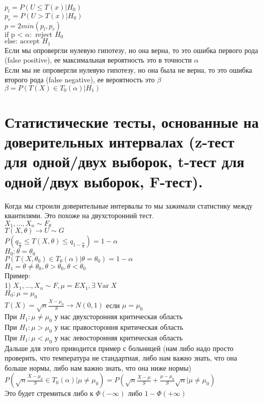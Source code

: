 \documentclass{article}
\newcommand\0{\mathbb{0}}
\DeclareMathOperator{\Var}{Var}
\newcommand\1{\mathbb{1}}
\begin{document}
$p_l = P(U \leq T(x) | H_0)$\\
$p_r = P(U > T(x) | H_0)$\\
$p = 2min(p_l, p_r)$\\
$\text{if p < } \alpha: \text{ reject }H_0$\\
$\text{else: accept }H_1$\\
Если мы опровергли нулевую гипотезу, но она верна, то это ошибка первого рода (false positive), ее максимальная вероятность это в точности $\alpha$\\
Если мы не опровергли нулевую гипотезу, но она была не верна, то это ошибка второго рода (false negative), ее вероятность это $\beta$\\
$\beta = P(T(X) \in T_0(\alpha) | H_1)$\\
\section{Статистические тесты, основанные на доверительных интервалах (z-тест для одной/двух
выборок, t-тест для одной/двух выборок, F-тест).}
Когда мы строили доверительные интервалы то мы зажимали статистику между квантилями. Это похоже на двухсторонний тест.\\
$X_1, \dots, X_n \sim F_{\theta}$\\
$T(X, \theta) \to U \sim G$\\
$P(q_{\frac{\alpha}{2}} \leq T(X, \theta) \leq q_{1 - \frac{\alpha}{2}}) = 1 - \alpha$\\
$H_0 : \theta = \theta_0$\\
$P(T(X, \theta_0) \in T_0(\alpha) | \theta = \theta_0) = 1 - \alpha$\\
$H_1 = \theta \neq \theta_0, \theta > \theta_0, \theta < \theta_0$\\
Пример:\\
1) $X_1, \dots, X_n \sim F, \mu = EX_1, \exists \Var X$\\
$H_0: \mu = \mu_0$\\
$T(X) = \sqrt{n} \frac{\overline{X} - \mu_0}{S} \to N(0, 1)$ если $\mu = \mu_0$\\
При $H_1: \mu \neq \mu_0$ у нас двухсторонняя критическая область\\
При $H_1: \mu > \mu_0$ у нас правостороння критическая область\\
При $H_1: \mu < \mu_0$ у нас левосторонняя критическая область\\
Дальше для этого приводится пример с больницей (нам либо надо просто проверить, что температура не стандартная, либо нам важно знать, что она больше нормы, либо нам важно знать, что она ниже нормы)\\
$P(\sqrt{n}\frac{\overline{X} - \mu_0}{S} \in T_0(\alpha) | \mu \neq \mu_0) = P(\sqrt{n}\frac{\overline{X} - \mu}{S} + \frac{\mu - \mu_0}{S}\sqrt{n} | \mu \neq \mu_0)$\\
Это будет стремиться либо к $\Phi(-\infty)$ либо $1 - \Phi(+\infty)$
\end{document}
